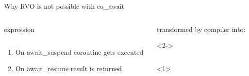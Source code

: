 \documentclass[10pt]{beamer}
\begin{document}
\begin{frame}{Why RVO is not possible with co\_await}
\begin{columns}[T]
\begin{column}{0.3\linewidth}
\centerline{expression}
\vfill
\inputminted{c++}{code-examples/RVO_examples/co_await.cpp}
\vfill

\begin{enumerate}
	\item<2-> On \alert{await\_suspend} coroutine gets executed
	\item<3-> On \alert{await\_resume} result is returned
\end{enumerate}

\end{column}
\begin{column}{0.55\linewidth}
\centerline{transformed by compiler into:}
\vfill
\begin{onlyenv}<2->
\inputminted[highlightlines={5,8}]{c++}{code-examples/RVO_examples/transformed_co_await.cpp}
\end{onlyenv}
<1>
\vfill
\end{column}
\end{columns}
\end{frame}
\end{document}
